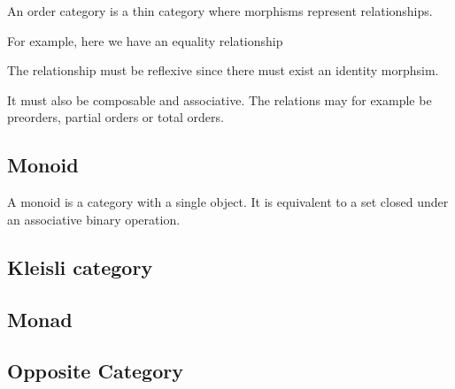 \documentclass{article}
\begin{document}
An order category is a thin category where morphisms represent relationships.

For example, here we have an equality relationship

\begin{center}
\end{center}

The relationship must be reflexive since there must exist an identity morphsim.

\begin{center}
\end{center}

It must also be composable and associative.
The relations may for example be preorders, partial orders
or total orders.


\subsection{Monoid}

A monoid is a category with a single object.
It is equivalent to a set closed under an associative binary operation. 

\subsection{Kleisli category}


\subsection{Monad}


\subsection{Opposite Category}
\end{document}

